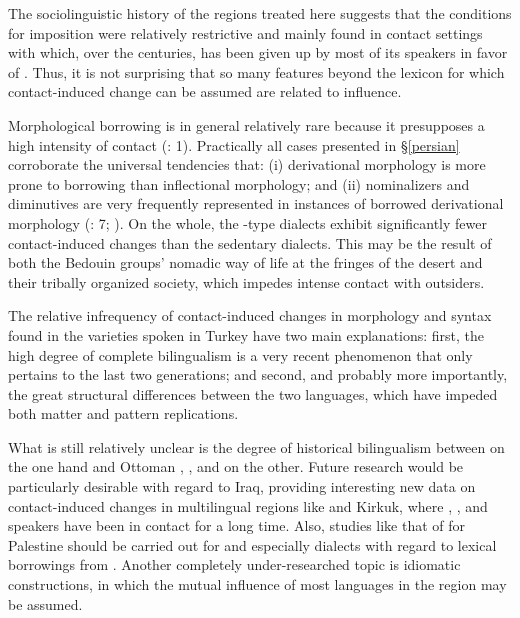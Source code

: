 \documentclass[output=paper]{langsci/langscibook}
\begin{document}
The sociolinguistic history of the regions treated here suggests that the conditions for {imposition} were relatively restrictive and mainly found in contact settings with  which, over the centuries, has been given up by most of its speakers in favor of . Thus, it is not surprising that so many features beyond the lexicon for which contact-induced change can be assumed are related to  influence. 

Morphological borrowing is in general relatively rare because it presupposes a high intensity of contact (\citealt{GardaniArkadievAmiridze2015}: 1). Practically all cases presented in §\ref{persian} corroborate the universal tendencies that: (i) {derivational} morphology is more prone to borrowing than {inflectional} morphology; and (ii) nominalizers and diminutives are very frequently represented in instances of borrowed {derivational} morphology (\citealt{GardaniArkadievAmiridze2015}: 7; \citealt{Seifart2013}). On the whole, the -type dialects exhibit significantly fewer contact-induced changes than the sedentary dialects. This may be the result of both the Bedouin groups' nomadic way of life at the fringes of the desert and their tribally organized society, which impedes intense contact with outsiders.

The {relative} infrequency of contact-induced changes in morphology and syntax found in the  varieties spoken in Turkey have two main explanations: first, the high degree of complete {bilingualism} is a very recent phenomenon that only pertains to the last two generations; and second, and probably more importantly, the great structural differences between the two languages, which have impeded both matter and pattern replications.

What is still relatively unclear is the degree of historical {bilingualism} between  on the one hand and Ottoman , , and  on the other. Future research would be particularly desirable with regard to Iraq, providing interesting new data on contact-induced changes in multilingual regions like  and Kirkuk, where , , and  speakers have been in contact for a long time. Also, studies like that of  \citet{Neishtadt2015} for Palestine should be carried out for  and especially  dialects with regard to lexical borrowings from . Another completely under-researched topic is {idiomatic} constructions, in which the mutual influence of most languages in the region may be assumed.
\end{document}
